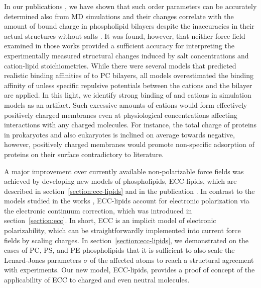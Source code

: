 In our publications \citep{catte16, nmrlipids_proj4},
we have shown that such order parameters can be accurately determined also from MD simulations
and their changes correlate with the amount of bound charge in phospholipid bilayers
despite the inaccuracies in their actual structures without salts \citep{botan15}. 
It was found, however, that
neither force field examined in those works 
provided a sufficient accuracy for interpreting 
the experimentally measured structural changes induced by salt concentrations
and cation-lipid stoichiometries. 
While there were several models
that predicted realistic binding affinities of  to PC bilayers,
all models overestimated the binding affinity of 
unless specific repulsive potentials between the cations and the bilayer are applied. \citep{catte16, nmrlipids_proj4}
In this light,
we identify strong binding of  and  cations
in simulation models as an artifact.  
Such excessive amounts of cations 
would form effectively positively charged membranes
even at physiological concentrations
affecting interactions with any charged molecules. 
For instance,
the total charge of proteins
in prokaryotes and also eukaryotes 
is inclined on average towards negative,
\citep{link1997identifying, link1997comparing, urquhart1998comparison, schwartz2001whole, knight2004global}
however,
positively charged membranes would promote non-specific adsorption of proteins on their surface 
contradictory to literature.  
\citep{junkova2016, lingwood2010lipid, sekerevs2015song} 


A major improvement over currently available non-polarizable force fields
was achieved by developing new models of phospholipids, 
ECC-lipids,
which are described in section~\ref{section:ecc-lipids}
and in the publication \citep{melcr18}. 
In contrast to the models studied in the works \citep{catte16, nmrlipids_proj4},
ECC-lipids account for electronic polarization
via the electronic continuum correction,  
which was introduced in section~\ref{section:ecc}. 
In short, 
ECC is an implicit model of electronic polarizability,
which can be straightforwardly implemented into current force fields 
by scaling charges.  
In section~\ref{section:ecc-lipids},
we demonstrated on the cases of PC, PS, and PE phospholipids
that it is sufficient to also scale the Lenard-Jones parameters $\sigma$ of the affected atoms
to reach a structural agreement with experiments. 
Our new model, ECC-lipids,
provides a proof of concept of the applicability of ECC
to charged and even neutral molecules. 



